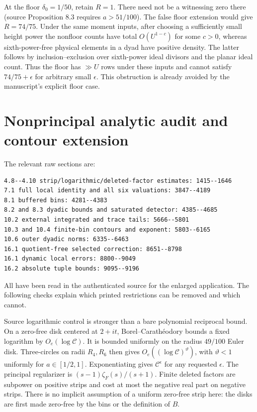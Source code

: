 \documentclass[12pt]{article}
\begin{document}
At the floor \(\delta_0=1/50\), retain \(R=1\).
There need not be a witnessing zero there (source Proposition 8.3
requires \(a>51/100\)).  The false floor extension would give
\(R=74/75\).  Under the same moment inputs, after choosing a
sufficiently small height power the nonfloor counts have total
\(O(U^{1-c})\) for some \(c>0\), whereas sixth-power-free physical
elements in a dyad have positive density.  The latter follows
by inclusion--exclusion over sixth-power ideal divisors and the
planar ideal count.  Thus the floor has \(\gg U\) rows under
these inputs and cannot satisfy \(74/75+\epsilon\) for arbitrary
small \(\epsilon\).  This obstruction is already avoided by the
manuscript's explicit floor case.

\section{Nonprincipal analytic audit and contour extension}
The relevant raw sections are:
\begin{verbatim}
4.8--4.10 strip/logarithmic/deleted-factor estimates: 1415--1646
7.1 full local identity and all six valuations: 3847--4189
8.1 buffered bins: 4281--4383
8.2 and 8.3 dyadic bounds and saturated detector: 4385--4685
10.2 external integrated and trace tails: 5666--5801
10.3 and 10.4 finite-bin contours and exponent: 5803--6165
10.6 outer dyadic norms: 6335--6463
16.1 quotient-free selected correction: 8651--8798
16.1 dynamic local errors: 8800--9049
16.2 absolute tuple bounds: 9095--9196
\end{verbatim}
All have been read in the authenticated source for the enlarged
application.  The following checks explain which printed
restrictions can be removed and which cannot.

Source logarithmic control is stronger than a bare polynomial
reciprocal bound.  On a zero-free disk centered at \(2+it\),
Borel--Carath\'eodory bounds a fixed logarithm by \(O_e(\log\mathcal C)\).
It is bounded uniformly on the radius \(49/100\) Euler disk.
Three-circles on radii \(R_4,R_6\) then gives
\(O_e((\log\mathcal C)^\vartheta)\), with \(\vartheta<1\)
uniformly for \(a\in[1/2,1]\).  Exponentiating gives
\(\mathcal C^\epsilon\) for any requested \(\epsilon\).
The principal regularizer is \((s-1)\zeta_F(s)/(s+1)\).
Finite deleted factors are subpower on positive strips and cost
at most the negative real part on negative strips.  There is no
implicit assumption of a uniform zero-free strip here: the disks
are first made zero-free by the bins or the definition of \(B\).
\end{document}

